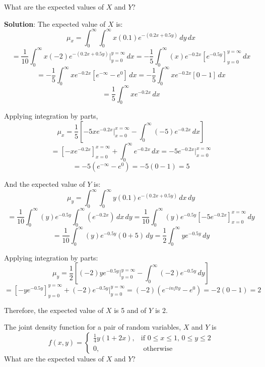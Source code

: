 What are the expected values of $X$ and $Y$?

\textbf{Solution}: The expected value of $X$ is:
$$\mu_x = \int_0^{\infty} \int_0^{\infty} x(0.1)e^{-(0.2x + 0.5y)}\,dy\,dx$$
$$= \frac{1}{10} \int_0^{\infty} x \left(-2 \right) e^{-(0.2x + 0.5y)}|_{y = 0}
^{y = \infty}\,dx = -\frac{1}{5} \int_0^{\infty} (x)e^{-0.2x} \left[ e^{-0.5y} 
\right]_{y = 0}^{y = \infty}\,dx$$
$$= -\frac{1}{5} \int_0^{\infty} xe^{-0.2x} \left[ e^{-\infty} - e^0 \right]
\,dx = -\frac{1}{5} \int_0^{\infty} xe^{-0.2x} \left[0 - 1 \right]\,dx $$
$$= \frac{1}{5} \int_0^{\infty} xe^{-0.2x}\,dx$$

Applying integration by parts, 
$$\mu_x = \frac{1}{5} \left[ -5xe^{-0.2x}|_{x = 0}^{x = \infty} - \int_0^{
\infty} (-5)e^{-0.2x}\,dx \right]$$
$$= \left[-xe^{-0.2x} \right]_{x = 0}^{x = \infty} + \int_0^{\infty} e^{-0.2x}
\,dx  = -5e^{-0.2x}|_{x = 0}^{x = \infty}$$
$$= -5 \left(e^{-\infty} - e^0 \right) = -5 \left(0 - 1 \right) = 5$$

And the expected value of $Y$ is:
$$\mu_y = \int_0^{\infty} \int_0^{\infty} y(0.1)e^{-(0.2x + 0.5y)}\,dx\,dy$$
$$= \frac{1}{10} \int_0^{\infty} (y)e^{-0.5y} \int_0^{\infty} \left(e^{-0.2x} 
\right)\,dx\,dy = \frac{1}{10} \int_0^{\infty} (y)e^{-0.5y} \left[ -5e^{-0.2x} 
\right]_{x = 0}^{x = \infty}\,dy$$
$$= \frac{1}{10} \int_0^{\infty} (y)e^{-0.5y} \left(0 + 5 \right)\,dy = \frac{
1}{2} \int_0^{\infty} ye^{-0.5y}\,dy$$

Applying integration by parts:
$$\mu_y = \frac{1}{2} \left[(-2)ye^{-0.5y}|_{y = 0}^{y = \infty} - \int_0^{
\infty} (-2)e^{-0.5y}\,dy \right]$$
$$= \left[-ye^{-0.5y} \right]_{y = 0}^{y = \infty} + (-2)e^{-0.5y}|_{y = 0}^{y 
= \infty} = (-2) \left( e^{-infty} - e^0 \right) = -2(0 - 1) = 2$$

Therefore, the expected value of $X$ is 5 and of $Y$ is 2. 

\begin{Exercise}[title = {Expected Values}, label = expect]
The joint density function for a pair of random variables, $X$ and $Y$ is
$$f(x, y) = 
\begin{cases}
	\frac{1}{4} y (1 + 2x),& \text{if } 0 \leq x \leq 1\text{, }0 \leq y \leq 2\\
	0,&\text{ otherwise}
\end{cases}$$
What are the expected values of $X$ and $Y$?
\end{Exercise}

